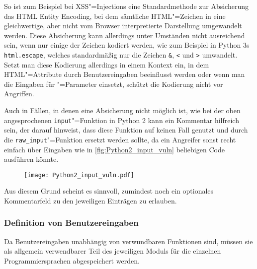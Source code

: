             So ist zum Beispiel bei
            \gls{XSS}"=Injections eine Standardmethode zur Absicherung das
            \gls{HTML} Entity Encoding,
            bei dem sämtliche
            \gls{HTML}"=Zeichen in eine gleichwertige,
            aber nicht vom Browser interpretierte Darstellung umgewandelt werden.
            Diese Absicherung kann allerdings unter Umständen nicht ausreichend sein,
            wenn nur einige der Zeichen kodiert werden,
            wie zum Beispiel in Python 3s
            \lstinline{html.escape},
            welches standardmäßig nur die Zeichen
            \texttt{\&},
            \texttt{<} und
            \texttt{>} umwandelt.\cite{PSF2018a}
            Setzt man diese Kodierung allerdings in einem Kontext ein,
            in dem
            \gls{HTML}"=Attribute durch Benutzereingaben beeinflusst werden oder
            wenn man die Eingaben für
            "=Parameter einsetzt,
            schützt die Kodierung nicht vor Angriffen.\cite{Janca2018}

            Auch in Fällen,
            in denen eine Absicherung nicht möglich ist,
            wie bei der oben angesprochenen
            \lstinline{input}"=Funktion in Python 2 kann ein Kommentar hilfreich sein,
            der darauf hinweist,
            dass diese Funktion auf keinen Fall genutzt und
            durch die
            \lstinline{raw_input}"=Funktion ersetzt werden sollte,
            da ein Angreifer sonst recht einfach über Eingaben wie
            in
            \vref{fig:Python2_input_vuln} beliebigen Code ausführen könnte.

            \begin{figure}[htp]
                \centering%
                \texttt{[image: Python2\_input\_vuln.pdf]}
                \label{fig:Python2_input_vuln}
            \end{figure}

            Aus diesem Grund scheint es sinnvoll,
            zumindest noch ein optionales Kommentarfeld zu den jeweiligen Einträgen zu erlauben.

            \subsubsection{Definition von Benutzereingaben}
                Da Benutzereingaben unabhängig von verwundbaren Funktionen sind,
                müssen sie als allgemein verwendbarer Teil des jeweiligen Moduls für die einzelnen Programmiersprachen abgespeichert werden.

